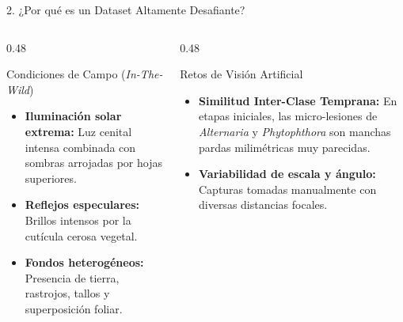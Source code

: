 \documentclass[aspectratio=169,10pt]{beamer}
\begin{document}
\begin{frame}{2. ¿Por qué es un Dataset Altamente Desafiante?}
    \begin{columns}[T]
        \begin{column}{0.48\textwidth}
            \begin{block}{Condiciones de Campo (\textit{In-The-Wild})}
                \begin{itemize}
                    \item \textbf{Iluminación solar extrema:} Luz cenital intensa combinada con sombras arrojadas por hojas superiores.
                    \item \textbf{Reflejos especulares:} Brillos intensos por la cutícula cerosa vegetal.
                    \item \textbf{Fondos heterogéneos:} Presencia de tierra, rastrojos, tallos y superposición foliar.
                \end{itemize}
            \end{block}
        \end{column}
        
        \begin{column}{0.48\textwidth}
            \begin{alertblock}{Retos de Visión Artificial}
                \begin{itemize}
                    \item \textbf{Similitud Inter-Clase Temprana:} En etapas iniciales, las micro-lesiones de \textit{Alternaria} y \textit{Phytophthora} son manchas pardas milimétricas muy parecidas.
                    \item \textbf{Variabilidad de escala y ángulo:} Capturas tomadas manualmente con diversas distancias focales.
                \end{itemize}
            \end{alertblock}
        \end{column}
    \end{columns}
\end{frame}
\end{document}

